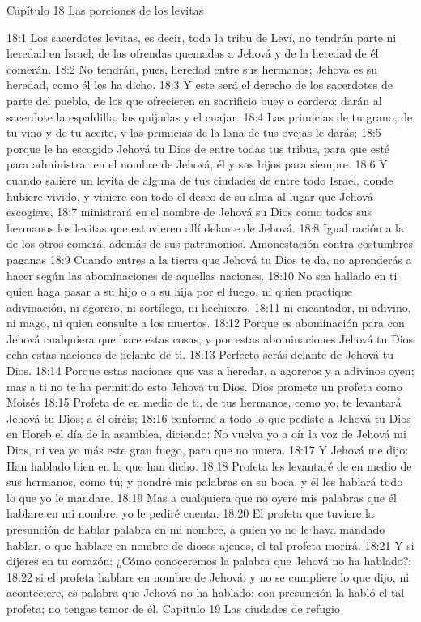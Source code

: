 Capítulo 18
Las porciones de los levitas  

18:1 Los sacerdotes levitas, es decir, toda la tribu de Leví, no tendrán parte ni heredad en Israel; de las ofrendas quemadas a Jehová y de la heredad de él comerán.  
18:2 No tendrán, pues, heredad entre sus hermanos; Jehová es su heredad, como él les ha dicho. 
18:3 Y este será el derecho de los sacerdotes de parte del pueblo, de los que ofrecieren en sacrificio buey o cordero: darán al sacerdote la espaldilla, las quijadas y el cuajar.  
18:4 Las primicias de tu grano, de tu vino y de tu aceite, y las primicias de la lana de tus ovejas le darás;  
18:5 porque le ha escogido Jehová tu Dios de entre todas tus tribus, para que esté para administrar en el nombre de Jehová, él y sus hijos para siempre.  
18:6 Y cuando saliere un levita de alguna de tus ciudades de entre todo Israel, donde hubiere vivido, y viniere con todo el deseo de su alma al lugar que Jehová escogiere,  
18:7 ministrará en el nombre de Jehová su Dios como todos sus hermanos los levitas que estuvieren allí delante de Jehová.  
18:8 Igual ración a la de los otros comerá, además de sus patrimonios.  
Amonestación contra costumbres paganas  
18:9 Cuando entres a la tierra que Jehová tu Dios te da, no aprenderás a hacer según las abominaciones de aquellas naciones.  
18:10 No sea hallado en ti quien haga pasar a su hijo o a su hija por el fuego, ni quien practique adivinación, ni agorero, ni sortílego, ni hechicero,  
18:11 ni encantador, ni adivino, ni mago, ni quien consulte a los muertos.  
18:12 Porque es abominación para con Jehová cualquiera que hace estas cosas, y por estas abominaciones Jehová tu Dios echa estas naciones de delante de ti.  
18:13 Perfecto serás delante de Jehová tu Dios. 
18:14 Porque estas naciones que vas a heredar, a agoreros y a adivinos oyen; mas a ti no te ha permitido esto Jehová tu Dios.  
Dios promete un profeta como Moisés  
18:15 Profeta de en medio de ti, de tus hermanos, como yo, te levantará Jehová tu Dios; a él oiréis;  
18:16 conforme a todo lo que pediste a Jehová tu Dios en Horeb el día de la asamblea, diciendo: No vuelva yo a oír la voz de Jehová mi Dios, ni vea yo más este gran fuego, para que no muera.  
18:17 Y Jehová me dijo: Han hablado bien en lo que han dicho.  
18:18 Profeta les levantaré de en medio de sus hermanos, como tú; y pondré mis palabras en su boca, y él les hablará todo lo que yo le mandare.  
18:19 Mas a cualquiera que no oyere mis palabras que él hablare en mi nombre, yo le pediré cuenta. 
18:20 El profeta que tuviere la presunción de hablar palabra en mi nombre, a quien yo no le haya mandado hablar, o que hablare en nombre de dioses ajenos, el tal profeta morirá.  
18:21 Y si dijeres en tu corazón: ¿Cómo conoceremos la palabra que Jehová no ha hablado?;  
18:22 si el profeta hablare en nombre de Jehová, y no se cumpliere lo que dijo, ni aconteciere, es palabra que Jehová no ha hablado; con presunción la habló el tal profeta; no tengas temor de él.  
Capítulo 19
Las ciudades de refugio  

